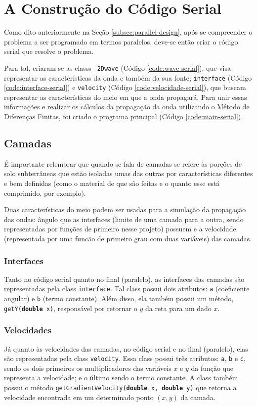 \section{A Construção do Código Serial}


Como dito anteriormente na Seção \ref{subsec:parallel-design},
após se compreender o problema a ser programado em termos paralelos,
deve-se então criar o código serial que resolve o problema.

Para tal, criaram-se as \glspl{class} \texttt{\_2Dwave} (Código \ref{code:wave-serial}), que visa representar as características da
onda e também da sua fonte; \texttt{interface} (Código \ref{code:interface-serial}) e \texttt{velocity}
(Código \ref{code:velocidade-serial}), que buscam representar as características do meio em que a onda propagará.
Para unir essas informações e realizar os cálculos da propagação da onda utilizando o Método de Diferenças Finitas, foi
criado o programa principal (Código \ref{code:main-serial}).

\subsection{Camadas}
É importante relembrar que quando se fala de camadas se refere às porções de solo subterrâneas
que estão isoladas umas das outras por características diferentes e bem definidas (como o material
de que são feitas e o quanto esse está comprimido, por exemplo). 

Duas características do meio podem ser
usadas para a simulação da propagação das ondas: ângulo que as interfaces (limite de uma camada para a outra,
sendo representadas por funções de primeiro nesse projeto) possuem e a velocidade (representada por uma funcão de
primeiro grau com duas variáveis) das camadas.

\subsubsection{Interfaces}
Tanto no código serial quanto no final (paralelo), as interfaces das camadas são representadas
pela \gls{class} \texttt{interface}. Tal \gls{class} possui dois atributos: \texttt{a} (coeficiente angular) e
\texttt{b} (termo constante). Além disso, ela também possui um método, \texttt{getY(\textbf{double} x)}, responsável por retornar
o $y$ da reta para um dado $x$.

\subsubsection{Velocidades}
Já quanto às velocidades das camadas, no código serial e no final (paralelo), elas são representadas
pela \gls{class} \texttt{velocity}. Essa \gls{class} possui três atributos: \texttt{a}, \texttt{b} e \texttt{c},
sendo os dois primeiros os multiplicadores das variáveis $x$ e $y$ da função que representa a velocidade; e o último
sendo o termo constante. A \gls{class} também possui o método \texttt{getGradientVelocity(\textbf{double} x, \textbf{double} y)}
que retorna a velocidade encontrada em um determinado ponto $(x, y)$ da camada.

